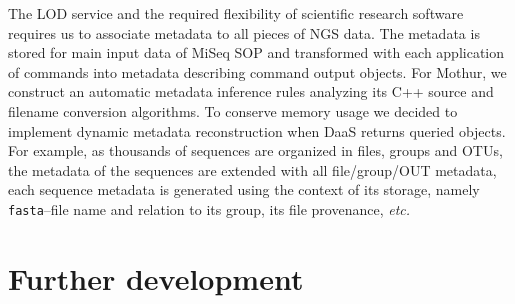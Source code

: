 \documentclass[a4paper]{jpconf}
\begin{document}
The LOD service and the required flexibility of scientific research software requires us to associate metadata to all pieces of NGS data.  The metadata is stored for main input data of MiSeq SOP and transformed with each application of commands into metadata describing command output objects.  For Mothur, we construct an automatic metadata inference rules analyzing its C++ source and filename conversion algorithms.  To conserve memory usage we decided to implement dynamic metadata reconstruction when DaaS returns queried objects.  For example, as thousands of sequences are organized in files, groups and OTUs, the metadata of the sequences are extended with all file/group/OUT metadata, each sequence metadata is generated using the context of its storage, namely \verb|fasta|--file name and relation to its group, its file provenance, \emph{etc.}


\section{Further development}
\end{document}
